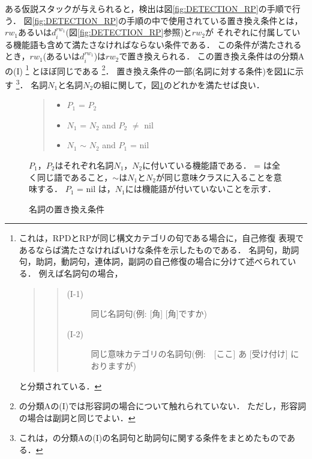 ある仮説スタックが与えられると，検出は図\ref{fig:DETECTION_RP}の手順で行う．
図\ref{fig:DETECTION_RP}の手順の中で使用されている置き換え条件とは，
$rw_1$あるいは$d_i^{rw_1}$(図\ref{fig:DETECTION_RP}参照)と$rw_2$が
それぞれに付属している機能語も含めて満たさなければならない条件である．
この条件が満たされるとき，$rw_1$(あるいは$d_i^{rw_1}$)は$rw_2$で置き換えられる．
この置き換え条件は\cite{NM1998}の分類Aの(I)
\footnote{
これは，RPDとRPが同じ構文カテゴリの句である場合に，自己修復
表現であるならば満たさなければいけな条件を示したものである．
名詞句，助詞句，助詞，動詞句，連体詞，副詞の自己修復の場合に分けて述べられている．
例えば名詞句の場合，
\begin{quote}\begin{quote}
\begin{description}
\item[(I-1)] 同じ名詞句(例: [角] [角]ですか)
\item[(I-2)] 同じ意味カテゴリの名詞句(例:　[ここ] あ [受け付け] におりますが)
\end{description}
\end{quote}\end{quote}
と分類されている．
}
とほぼ同じである
\footnote{
\cite{NM1998}の分類Aの(I)では形容詞の場合について触れられていない．
ただし，形容詞の場合は副詞と同じでよい．
}．
置き換え条件の一部(名詞に対する条件)を図\ref{fig:REPLACE_COND}に示す
\footnote{
これは，\cite{NM1998}の分類Aの(I)の名詞句と助詞句に関する条件をまとめたものである．
}．
名詞$N_1$と名詞$N_2$の組に関して，図\ref{fig:REPLACE_COND}のどれかを満たせば良い．


\begin{figure}
\small
\begin{center}
\begin{minipage}{.5\linewidth}
\begin{quote}
\begin{itemize}
\item $P_1$ = $P_2$
\item $N_1$ = $N_2$ and $P_2$ $\neq$ nil
\item $N_1$ $\sim$ $N_2$ and $P_1$ = nil
\end{itemize}
\end{quote}
$P_1$，$P_2$はそれぞれ名詞$N_1$，$N_2$に付いている機能語である．
= は全く同じ語であること，$\sim$は$N_1$と$N_2$が同じ意味クラスに入ることを意味する．
$P_1$ = nil は，$N_1$には機能語が付いていないことを示す．
\end{minipage}
\end{center}

\caption{名詞の置き換え条件}
\label{fig:REPLACE_COND}
\end{figure}



